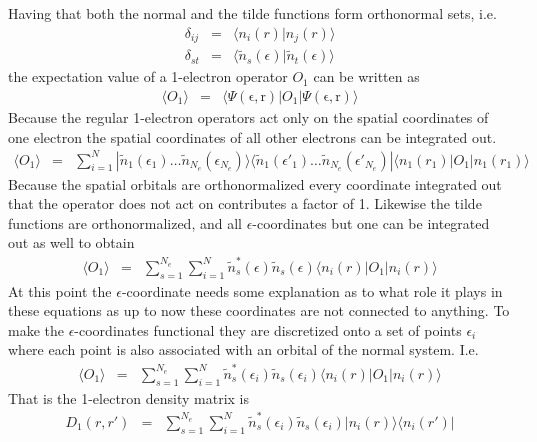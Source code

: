 \documentclass[aip,graphicx]{revtex4-1}
\begin{document}
\begin{itemize}
    Having that both the normal and the tilde functions form orthonormal sets, i.e.
    \begin{eqnarray}
    \delta_{ij} &=& \langle n_i(r)|n_j(r)\rangle \\
    \delta_{st} &=& \langle\tilde{n}_s(\epsilon)|\tilde{n}_t(\epsilon)\rangle
    \end{eqnarray}
    the expectation value of a 1-electron operator $O_1$ can be written as
    \begin{eqnarray}
    \langle O_1\rangle &=& \langle\Psi(\mathrm{\epsilon},\mathrm{r})|O_1|\Psi(\mathrm{\epsilon},\mathrm{r})\rangle
    \end{eqnarray}
    Because the regular 1-electron operators act only on the spatial coordinates of one electron the spatial coordinates of all other electrons can be integrated out.
    \begin{eqnarray}
    \langle O_1\rangle &=&
    \sum_{i=1}^{N}|\tilde{n}_1(\epsilon_1)\ldots\tilde{n}_{N_e}(\epsilon_{N_e})\rangle\langle\tilde{n}_1(\epsilon'_1)\ldots\tilde{n}_{N_e}(\epsilon'_{N_e})|\langle n_1(r_1)|O_1|n_1(r_1)\rangle
    \end{eqnarray}
    Because the spatial orbitals are orthonormalized every coordinate integrated out that the operator does not act on contributes a factor of 1. Likewise the tilde functions are orthonormalized, and all $\epsilon$-coordinates but one can be integrated out as well to obtain
    \begin{eqnarray}
    \langle O_1\rangle
    &=& \sum_{s=1}^{N_e}\sum_{i=1}^N
        \tilde{n}_s^*(\epsilon)\tilde{n}_s(\epsilon)\langle n_i(r)|O_1|n_i(r)\rangle
    \end{eqnarray}
    At this point the $\epsilon$-coordinate needs some explanation as to what role it plays in these equations as up to now these coordinates are not connected to anything. To make the $\epsilon$-coordinates functional they are discretized onto a set of points $\epsilon_i$ where each point is also associated with an orbital of the normal system. I.e.
    \begin{eqnarray}
    \langle O_1\rangle
    &=& \sum_{s=1}^{N_e}\sum_{i=1}^N
        \tilde{n}_s^*(\epsilon_i)\tilde{n}_s(\epsilon_i)\langle n_i(r)|O_1|n_i(r)\rangle
    \end{eqnarray}
    That is the 1-electron density matrix is
    \begin{eqnarray}
    \label{Eq:D1}
    D_1(r,r') &=& \sum_{s=1}^{N_e}\sum_{i=1}^N
        \tilde{n}_s^*(\epsilon_i)\tilde{n}_s(\epsilon_i)|n_i(r)\rangle\langle n_i(r')|
    \end{eqnarray}
    

\end{itemize}
\end{document}
